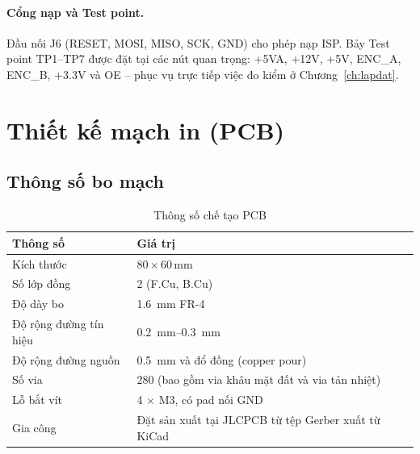 \paragraph{Cổng nạp và Test point.} Đầu nối J6 (RESET, MOSI, MISO, SCK, GND) cho phép nạp ISP. Bảy Test point TP1--TP7 được đặt tại các nút quan trọng: +5VA, +12V, +5V, ENC\_A, ENC\_B, +3.3V và OE -- phục vụ trực tiếp việc đo kiểm ở Chương~\ref{ch:lapdat}.

\section{Thiết kế mạch in (PCB)}

\subsection{Thông số bo mạch}
\begin{table}[H]
\centering\small
\caption{Thông số chế tạo PCB}
\label{tab:pcbspec}
\begin{tabular}{@{}ll@{}}
\toprule
\textbf{Thông số} & \textbf{Giá trị}\\
\midrule
Kích thước & 80\,$\times$\,60\,mm\\
Số lớp đồng & 2 (F.Cu, B.Cu)\\
Độ dày bo & \SI{1.6}{\milli\metre} FR-4\\
Độ rộng đường tín hiệu & \SIrange{0.2}{0.3}{\milli\metre}\\
Độ rộng đường nguồn & \SI{0.5}{\milli\metre} và đổ đồng (copper pour)\\
Số via & 280 (bao gồm via khâu mặt đất và via tản nhiệt)\\
Lỗ bắt vít & 4 $\times$ M3, có pad nối GND\\
Gia công & Đặt sản xuất tại JLCPCB từ tệp Gerber xuất từ KiCad\\
\bottomrule
\end{tabular}
\end{table}

